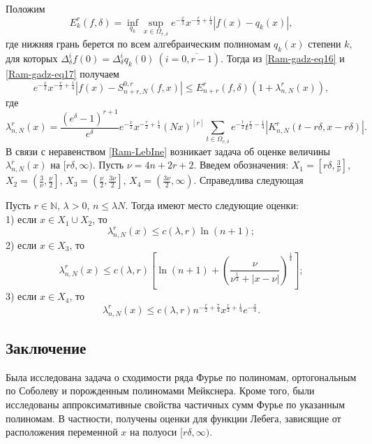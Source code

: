 Положим
\begin{equation}\label{Ram-gadz-eq17}
E_{k}^r(f,\delta)=\inf_{q_{k}}\sup_{x\in\Omega_{r,\delta}} e^{-{\frac{x}{2}}}x^{-{\frac{r}{2}}+{\frac{1}{4}}}\left|f(x)-q_{k}(x)\right|,
\end{equation}
где нижняя грань берется по всем алгебраическим полиномам $q_{k}(x)$ степени $k,$ для которых $\Delta_\delta^i f(0)=\Delta_\delta^i q_{k}(0)\ (i=\overline{0, r-1}).$
Тогда из \eqref{Ram-gadz-eq16} и \eqref{Ram-gadz-eq17} получаем
\begin{equation}\label{Ram-LebIne}
e^{-{\frac{x}{2}}}x^{-{\frac{r}{2}}+{\frac{1}{4}}}\left|f(x)-S_{n+r,N}^{0,r}(f,x)\right|\leq E_{n+r}^r(f,\delta)(1+\lambda_{n,N}^{r}(x)),
\end{equation}
где
$$
\lambda_{n,N}^{r}(x)=\frac{(e^{\delta}-1)^{r+1}}{e^\delta}e^{-{\frac{x}{2}}}x^{-{\frac{r}{2}}+{\frac{1}{4}}}(Nx)^{[r]}
\sum_{t\in\Omega_{r,\delta}}e^{-{\frac{t}{2}}}t^{{\frac{r}{2}}-{\frac{1}{4}}}
\left|K_{n,N}^r(t-r\delta,x-r\delta)\right|.
$$
В связи с неравенством \eqref{Ram-LebIne} возникает задача об оценке величины $\lambda_{n,N}^{r}(x)$ на $[r\delta,\infty)$. Пусть $\nu=4n+2r+2$. Введем обозначения:
$X_1=\left[r\delta, \frac{3}{\nu}\right]$,
$X_2=\left(\frac{3}{\nu}, \frac{\nu}{2}\right]$,
$X_3=\left(\frac{\nu}{2}, \frac{3\nu}{2}\right]$,
$X_4=\left(\frac{3\nu}{2}, \infty\right)$.
Справедлива следующая
\begin{theorem}\label{Ram-theoMex2}
Пусть $r\in\mathbb{N}$, $\lambda> 0$, $n\leq\lambda N.$ Тогда имеют место следующие оценки:\\
1) если $x\in X_1\cup X_2$, то
$$
\lambda_{n,N}^{r}(x)\leq c(\lambda, r)\ln (n+1);
$$
2) если $x\in X_3$, то
$$
\lambda_{n,N}^{r}(x)\leq c(\lambda,r)\left[\ln(n+1)+\left(\frac{\nu}{\nu^{\frac{1}{3}}+|x-\nu|}\right)^{\frac{1}{4}}\right];
$$
3) если $x\in X_4$, то
$$
\lambda_{n,N}^{r}(x)\leq c(\lambda,r)n^{-{\frac{r}{2}}+{\frac{7}{4}}}x^{{\frac{r}{2}}+{\frac{1}{4}}}e^{-\frac{x}{4}}.
$$
\end{theorem}

\subsection{Заключение}
Была исследована задача о сходимости ряда Фурье по полиномам, ортогональным по Соболеву и порожденным полиномами Мейкснера.
Кроме того, были исследованы аппроксимативные свойства частичных сумм Фурье по указанным полиномам. В частности, получены оценки для функции Лебега, зависящие от расположения переменной $x$ на полуоси $[r\delta, \infty)$.




	




